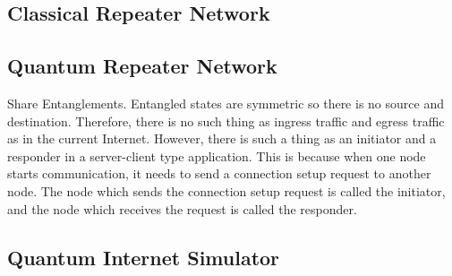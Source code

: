 \subsection{Classical Repeater Network}
\subsection{Quantum Repeater Network}
Share Entanglements.
Entangled states are symmetric so there is no source and destination.
Therefore, there is no such thing as ingress traffic and egress traffic as in the current Internet.
However, there is such a thing as an initiator and a responder in a server-client type application.
This is because when one node starts communication, it needs to send a connection setup request to another node.
The node which sends the connection setup request is called the initiator, and the node which receives the request is called the responder.

\subsection{Quantum Internet Simulator}
\cite{satoh2021quisp}

